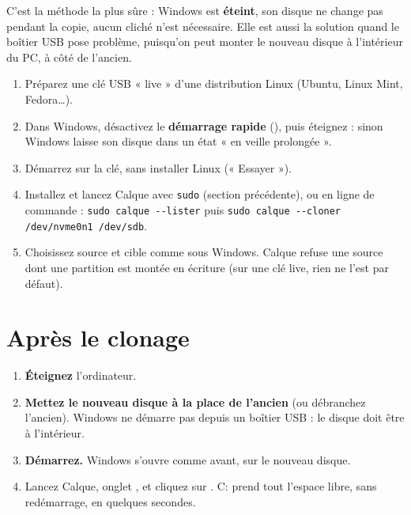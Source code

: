 C'est la méthode la plus sûre : Windows est \textbf{éteint}, son disque ne change pas pendant la
copie, aucun cliché n'est nécessaire. Elle est aussi la solution quand le boîtier USB pose problème,
puisqu'on peut monter le nouveau disque à l'intérieur du PC, à côté de l'ancien.

\begin{enumerate}
\item Préparez une clé USB « live » d'une distribution Linux (Ubuntu, Linux Mint, Fedora…).
\item Dans Windows, désactivez le \textbf{démarrage rapide} (), puis éteignez : sinon Windows laisse
      son disque dans un état « en veille prolongée ».
\item Démarrez sur la clé, sans installer Linux (« Essayer »).
\item Installez et lancez Calque avec \texttt{sudo} (section précédente), ou en ligne de commande :
      \texttt{sudo calque -{}-lister} puis \texttt{sudo calque -{}-cloner /dev/nvme0n1 /dev/sdb}.
\item Choisissez source et cible comme sous Windows. Calque refuse une source dont une partition
      est montée en écriture (sur une clé live, rien ne l'est par défaut).
\end{enumerate}

\section{Après le clonage}\label{sec:apres}

\begin{enumerate}
\item \textbf{Éteignez} l'ordinateur.
\item \textbf{Mettez le nouveau disque à la place de l'ancien} (ou débranchez l'ancien).
      Windows ne démarre pas depuis un boîtier USB : le disque doit être à l'intérieur.
\item \textbf{Démarrez.} Windows s'ouvre comme avant, sur le nouveau disque.
\item Lancez Calque, onglet , et cliquez sur . C: prend
      tout l'espace libre, sans redémarrage, en quelques secondes.
\end{enumerate}



